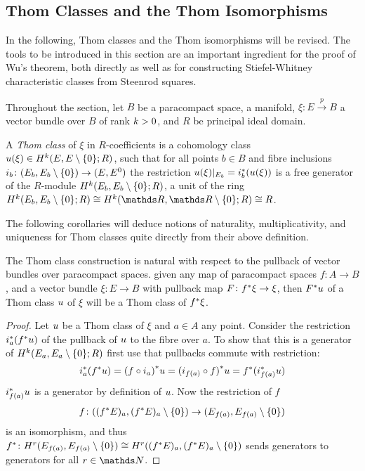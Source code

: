 \subsection{Thom Classes and the Thom Isomorphisms}\label{sec:thomclasses}
In the following, Thom classes and the Thom isomorphisms will be
revised. The tools to be introduced in this section are an important
ingredient for the proof of Wu's theorem, both directly as well as for
constructing Stiefel-Whitney characteristic classes from Steenrod
squares.

Throughout the section,
let $B$ be a paracompact space, \forexample a manifold,
$\xi\colon E\xrightarrow{p} B$ a vector bundle over $B$ of rank $k>0$,
and $R$ be principal ideal domain.
\begin{Def}
  A \emph{Thom class} of $\xi$ in $R$-coefficients is a
  cohomology class ${u}(\xi)\in H^{k}(E, {E}\setminus\{0\}; R)$,
  such that for all points $b\in B$ and fibre inclusions
  $i_b\colon (E_b, {E_b}\setminus\{0\}) \to (E, {E}^0)$
  the restriction ${u}(\xi)|_{E_b} = {i}^*_b ({u}(\xi))$ is a
  free generator of the $R$-module $H^{k}(E_b, {E_b}\setminus\{0\}; R)$,
  \idest a unit
  of the ring
  $\H^{\rkk}(\spherepair{E_b};R)\cong \H^{\rkk}(\spherepair{\R}; R)\cong R$.
\end{Def}

The following corollaries will deduce notions of naturality,
multiplicativity, and uniqueness for Thom classes quite directly from
their above definition.

\begin{Cor}\label{cor:thomclsnatural}
  The Thom class construction is natural with respect to the pullback
  of vector bundles over paracompact spaces.
  \Idest given any map of paracompact spaces $f\colon A\to B$, and a
  vector bundle $\xi\colon E\to B$ with pullback map
  $F\colon{f}^*\xi\to\xi$,
  then ${F}^* u$ of a Thom class $u$ of $\xi$ will
  be a Thom class of ${f}^* \xi$.
  \begin{proof}
    Let $u$ be a Thom class of $\xi$ and $a\in A$ any point.
    Consider the restriction ${i}^*_a({f}^* u)$
    of the pullback of $u$ to the fibre over $a$. To show that this
    is a generator of $H^{k}(E_a, {E_a}\setminus\{0\};R)$ first use that
    pullbacks commute with restriction:
    \begin{gather*}
      {i}^*_a({f}^* u)
      = {(f\circ i_a)}^* u
      = {(i_{f(a)}\circ f)}^* u
      = {f}^* ({i}^*_{f(a)} u)
    \end{gather*}
    ${i}^*_{f(a)} u$ is a generator by definition of $u$.
    Now the restriction of $f$
    \begin{gather*}
      f\colon (({f}^* E)_a, {({f}^* E)_a}\setminus\{0\}) \to (E_{f(a)}, {E_{f(a)}}\setminus\{0\})
    \end{gather*}
    is an isomorphism, and thus
    ${f}^*\colon H^r(E_{f(a)}, {E_{f(a)}}\setminus\{0\})
    \cong H^r(({f}^* E)_a, {({f}^* E)_a}\setminus\{0\})$
    sends generators to generators for all $r\in\Nat$.
  \end{proof}
\end{Cor}

